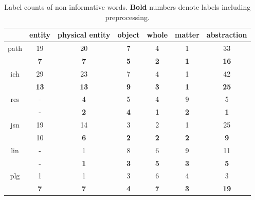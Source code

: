 {%
\begin{table}
	\begin{tabular}{c|c|c|c|c|c|c}
		& entity	& physical entity & object & whole & matter & abstraction\\
		\hline
		path& 19		&20				  &7	   &4      &1       &33\\
		& \textbf{7}&\textbf{7}	 &\textbf{5}  &\textbf{2} &\textbf{1} &\textbf{16}\\
		\hline
		ich& 29		&23				  &7	   &4      &1       &42\\
		& \textbf{13}&\textbf{13}	 &\textbf{9}  &\textbf{3} &\textbf{1} &\textbf{25}\\
		\hline
		res& -		&4				  &5	   &4      &9       &5\\
		& -			&\textbf{2}	 &\textbf{4}  &\textbf{1} &\textbf{2} &\textbf{1}\\
		\hline
		jsn& 19		&14				  &3	   &2      &1       &25\\
		&10 		&\textbf{6}	 &\textbf{2}  &\textbf{2} &\textbf{2} &\textbf{9}\\
		\hline
		lin& -		&1				  &8	   &6      &9       &11\\
		& -	 	&\textbf{1}	 &\textbf{3}  &\textbf{5} &\textbf{3} &\textbf{5}\\
		\hline
		plg& 1		&1		 &3	   &6      &4       &3\\
		& \textbf{7}&\textbf{7}	 &\textbf{4}  &\textbf{7} &\textbf{3} &\textbf{19}\\
	\end{tabular}
	\label{tab: label count non informative}
	\caption[Label counts of non informative words]{Label counts of non informative words. \textbf{Bold} numbers denote labels including preprocessing.}
\end{table}




}

